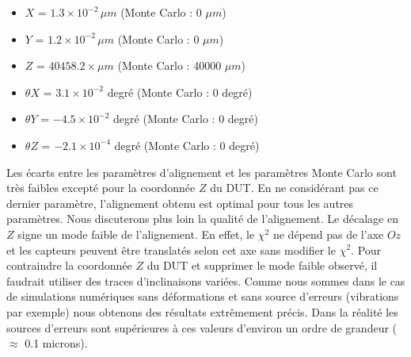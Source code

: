 % 
   
   \medskip
   
   \renewcommand{\labelitemi}{$\bullet$}
  
  \begin{itemize}
   \item $X$ = $1.3 \times 10^{-2} \, \mu m$ (Monte Carlo : 0 $\mu m$) 
   \item $Y$ = $1.2 \times 10^{-2} \, \mu m$ (Monte Carlo : 0 $\mu m$)
   \item $Z$ = $40458.2 \times \mu m$ (Monte Carlo : 40000 $\mu m$)
   \item $\theta X$ = $3.1 \times 10^{-2}$ degr\'e (Monte Carlo : 0 degr\'e)
   \item $\theta Y$ = $-4.5 \times 10^{-2}$ degr\'e (Monte Carlo : 0 degr\'e)
   \item $\theta Z$ = $-2.1 \times 10^{-4}$ degr\'e (Monte Carlo : 0 degr\'e)
  \end{itemize}
   
   \medskip   
   
   Les \'ecarts entre les param\`etres d'alignement et les param\`etres Monte Carlo sont tr\`es faibles except\'e pour la coordonn\'ee $Z$ du DUT. En ne consid\'erant pas ce dernier param\`etre, l'alignement obtenu est optimal pour tous les autres param\`etres. Nous discuterons plus loin la qualit\'e de l'alignement. Le d\'ecalage en $Z$ signe un mode faible de l'alignement. En effet, le $\chi^2$ ne d\'epend pas de l'axe $Oz$ et les capteurs peuvent \^etre translat\'es selon cet axe sans modifier le $\chi^2$. Pour contraindre la coordonn\'ee $Z$ du DUT et supprimer le mode faible observ\'e, il faudrait utiliser des traces d'inclinaisons vari\'ees. Comme nous sommes dans le cas de simulations num\'eriques sans d\'eformations et sans source d'erreurs (vibrations par exemple) nous obtenons des r\'esultats extr\^emement pr\'ecis. Dans la r\'ealit\'e les sources d'erreurs sont sup\'erieures \`a ces valeurs d'environ un ordre de grandeur ($\approx$ 0.1 microns).
   
